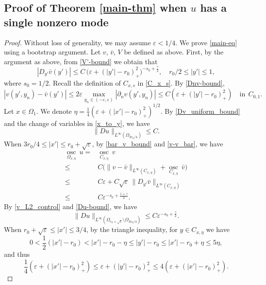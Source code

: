\documentclass[reqno, 10pt]{amsart}
\theoremstyle{plain}
\theoremstyle{definition}
\theoremstyle{remark}
\newcommand{\osc}{\operatorname{osc}}
\numberwithin{equation}{section}
\begin{document}
\subsection{Proof of Theorem \ref{main-thm} when  \texorpdfstring{$u$}{u} has a single nonzero mode}\label{sec3.1}
\begin{proof}
Without loss of generality, we may assume $\varepsilon<1/4$.
We prove \eqref{main-eq} using a bootstrap argument. Let $v$, $\bar{v}$, $V$ be defined as above. First, by the argument as above, from \eqref{V'-bound} we obtain that 
\begin{equation}\label{bar_v_bound}
    |D_{y'}\bar{v}(y')|\le C \,\big(\varepsilon + (|y'|-r_0)_+^2\big)^{-s_0+\frac{\gamma}{2}}, \quad r_0/2\le |y'|\le 1,
\end{equation}
where $s_0=1/2$.
Recall the definition of $C_{x,s}$ in \eqref{C_x_s}. By \eqref{Dnv-bound},
\begin{equation}
\label{v-v_bar}
|v(y', y_n) - \bar{v}(y')| \le 2\varepsilon \max_{y_n\in (- \varepsilon , \varepsilon)} |\partial_n v(y',y_n)| \le C (\varepsilon + (|y'|-r_0)_+^2) \quad \mbox{in}~~C_{0,1}.
\end{equation}
Let $x\in \Omega_1$. We denote $\eta=\frac{1}{4}(\varepsilon + (|x'|-r_0)_+^2)^{1/2}$.
By \eqref{Dv_uniform_bound} and the change of variables in \eqref{x_to_y}, we have 
$$
\| Du\|_{L^\infty (\Omega_{3r_0/4})} \le C.
$$
When $3r_0/4\le|x'|\le r_0+\sqrt\varepsilon$, 
by \eqref{bar_v_bound} and \eqref{v-v_bar}, we have
\begin{equation}
\begin{aligned}\label{v_L2_control}
\underset{\Omega_{x,\eta}}{\osc}~u =&  \underset{C_{x,\eta}}{\osc}~v \\
 \le& C\big( \|v-\bar{v}\|_{L^\infty(C_{x,\eta})} + \underset{C_{x,\eta}}{\osc}~\bar{v}\big)\\
 \le & C\varepsilon+C\sqrt{\varepsilon} \,\|D_{y'}\bar{v}\|_{L^\infty(C_{x,\eta})}\\
 \le& C \varepsilon^{-s_0+\frac{1+\gamma}2}.
\end{aligned}
\end{equation}
By \eqref{v_L2_control} and \eqref{Du-bound}, we have
$$
\| Du\|_{L^\infty (\Omega_{r_0+\sqrt\varepsilon}\setminus \Omega_{3r_0/4})} \le C\varepsilon^{-s_0+\frac{\gamma}2}.
$$
When $r_0+\sqrt\varepsilon \le|x'|\le 3/4$, by the triangle inequality, for $y\in C_{x,\eta}$ we have 
$$ 0<\frac{1}{2}(|x'|-r_0)<|x'|-r_0-\eta\le|y'|-r_0\le |x'|-r_0+\eta\le 5\eta,$$
and thus
$$\frac{1}{4}(\varepsilon + (|x'|-r_0)_+^2)\le \varepsilon + (|y'|-r_0)_+^2\le 4(\varepsilon + (|x'|-r_0)_+^2).$$

\end{proof}
\end{document}
